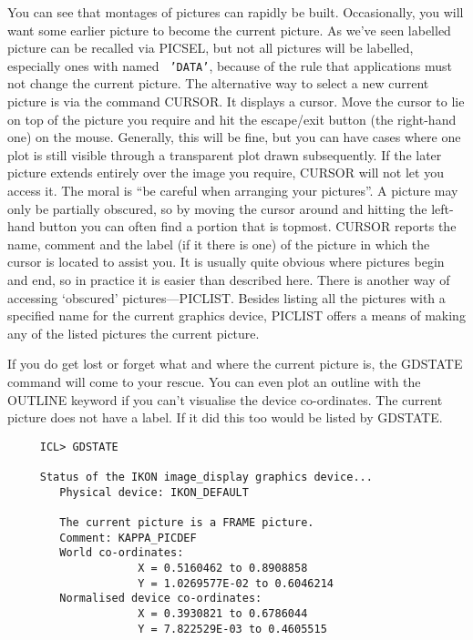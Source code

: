 {You can see that montages of pictures can rapidly be built.
Occasionally, you will want some earlier picture to become the current
picture. As we've seen labelled picture can be recalled via PICSEL, but
not all pictures will be labelled, especially ones with named {\tt
'DATA'}, because of the rule that applications must not change the
current picture.  The alternative way to select a new current picture
is via the command CURSOR.  It displays a cursor. Move the cursor
to lie on top of the picture you require and hit the escape/exit button
(the right-hand one) on the mouse. Generally, this will be fine, but you can
have cases where one plot is still visible through a transparent plot drawn
subsequently. If the later picture extends entirely over the image you
require, CURSOR will not let you access it.  The moral is ``be careful when
arranging your pictures''. A picture may only be partially obscured, so by
moving the cursor around and hitting the left-hand button you can
often find a portion that is topmost.  CURSOR reports the name, comment
and the label (if it there is one) of the picture in which the cursor is
located to assist you. It is usually quite obvious where pictures begin
and end, so in practice it is easier than described here.  There is
another way of accessing `obscured' pictures---PICLIST.  Besides listing
all the pictures with a specified name for the current graphics device,
PICLIST offers a means of making any of the listed pictures the current
picture.

If you do get lost or forget what and where the current picture is,
the GDSTATE command will come to your rescue.  You can even plot an
outline with the OUTLINE keyword if you can't visualise the device
co-ordinates. The current picture does not have a label.  If it did
this too would be listed by GDSTATE.

\small
\begin{verbatim}
     ICL> GDSTATE
 
     Status of the IKON image_display graphics device...
        Physical device: IKON_DEFAULT
 
        The current picture is a FRAME picture.
        Comment: KAPPA_PICDEF
        World co-ordinates:
                    X = 0.5160462 to 0.8908858
                    Y = 1.0269577E-02 to 0.6046214
        Normalised device co-ordinates:
                    X = 0.3930821 to 0.6786044
                    Y = 7.822529E-03 to 0.4605515
 
\end{verbatim}
\normalsize

}
